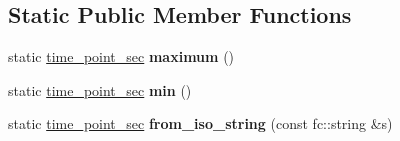 \subsection*{Static Public Member Functions}
\begin{DoxyCompactItemize}
\item 
\mbox{\label{classfc_1_1time__point__sec_a45d3b7342e76cfb07ef1845d75b57a39}} 
static \mbox{\hyperlink{classfc_1_1time__point__sec}{time\+\_\+point\+\_\+sec}} {\bfseries maximum} ()
\item 
\mbox{\label{classfc_1_1time__point__sec_a9e403874fef172903950ad8d0f3120c6}} 
static \mbox{\hyperlink{classfc_1_1time__point__sec}{time\+\_\+point\+\_\+sec}} {\bfseries min} ()
\item 
\mbox{\label{classfc_1_1time__point__sec_ac2a18f665e7718f6992d17e4d80fc15f}} 
static \mbox{\hyperlink{classfc_1_1time__point__sec}{time\+\_\+point\+\_\+sec}} {\bfseries from\+\_\+iso\+\_\+string} (const fc\+::string \&s)
\end{DoxyCompactItemize}
